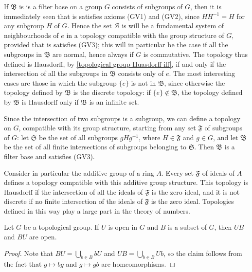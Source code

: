 \begin{example}\label{topological group given by filter of subgroups}
If $\mathfrak{B}$ is is a filter base on a group $G$ consists of subgroups of $G$, then it is immediately seen that is satisfies axioms (GV1) and (GV2), since $HH^{-1}=H$ for any subgroup $H$ of $G$. Hence the set $\mathcal{B}$ is will be a fundamental system of neighbourhoods of $e$ in a topology compatible with the group structure of $G$, provided that is satisfies (GV3); this will in particular be the case if all the subgroups in $\mathfrak{B}$ are normal, hence always if $G$ is commutative. The topology thus defined is Hausdorff, by \cref{topological group Huasdorff iff}, if and only if the intersection of all the subgroups in $\mathfrak{B}$ consists only of $e$. The most interesting cases are those in which the subgroup $\{e\}$ is not in $\mathfrak{B}$, since otherwise the topology defined by $\mathfrak{B}$ is the discrete topology: if $\{e\}\notin\mathfrak{B}$, the topology defined by $\mathfrak{B}$ is Hausdorff only if $\mathfrak{B}$ is an infinite set.\par
Since the intersection of two subgroups is a subgroup, we can define a topology on $G$, compatible with its group structure, starting from any set $\mathfrak{F}$ of subgroups of $G$: let $\mathfrak{S}$ be the set of all subgroups $gHg^{-1}$, where $H\in\mathfrak{F}$ and $g\in G$, and let $\mathfrak{B}$ be the set of all finite intersections of subgroups belonging to $\mathfrak{S}$. Then $\mathfrak{B}$ is a filter base and satisfies (GV3).\par
Consider in particular the additive group of a ring $A$. Every set $\mathfrak{F}$ of ideals of $A$ defines a topology compatible with this additive group structure. This topology is Hausdorff if the intersection of all the ideals of $\mathfrak{F}$ is the zero ideal, and it is not discrete if no finite intersection of the ideals of $\mathfrak{F}$ is the zero ideal. Topologies defined in this way play a large part in the theory of numbers.
\end{example}
\begin{proposition}\label{topological group product of open and subset}
Let $G$ be a topological group. If $U$ is open in $G$ and $B$ is a subset of $G$, then $UB$ and $BU$ are open.
\end{proposition}
\begin{proof}
Note that $BU=\bigcup_{b\in B}bU$ and $UB=\bigcup_{b\in B}Ub$, so the claim follows from the fact that $g\mapsto bg$ and $g\mapsto gb$ are homeomorphisms.
\end{proof}
